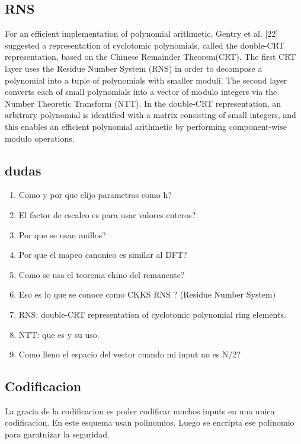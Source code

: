 \documentclass[12pt, oneside]{article}
\begin{document}
\subsection{RNS}
For an efficient implementation of polynomial arithmetic, Gentry et al. [22]
suggested a representation of cyclotomic polynomials, called the double-CRT representation,
based on the Chinese Remainder Theorem(CRT).
The first CRT layer uses the Residue Number System (RNS) in order to decompose a
polynomial into a tuple of polynomials with smaller moduli.
The second layer converts each of small polynomials into a vector of modulo integers
via the Number Theoretic Transform (NTT).
In the double-CRT representation, an arbitrary polynomial is identified with a
matrix consisting of small integers, and this enables an efficient polynomial arithmetic
by performing component-wise modulo operations.
\subsection{dudas}
\begin{enumerate}
  \item Como y por que elijo parametros como h?
  \item El factor de escaleo es para usar valores enteros?
  \item Por que se usan anillos?
  \item Por que el mapeo canonico es similar al DFT?
  \item Como se usa el teorema chino del remanente?
  \item Eso es lo que se conoce como CKKS RNS ? (Residue Number System)
  \item RNS: double-CRT representation of cyclotomic polynomial ring elements.
  \item NTT: que es y su uso.
  \item Como lleno el espacio del vector cuando mi input no es N/2?
\end{enumerate}




\subsection{Codificacion}

La gracia de la codificacion es poder codificar muchos inputs en una unica codificacion.
En este esquema usan polinomios.
Luego se encripta ese polinomio para garatnizar la seguridad.
\end{document}
